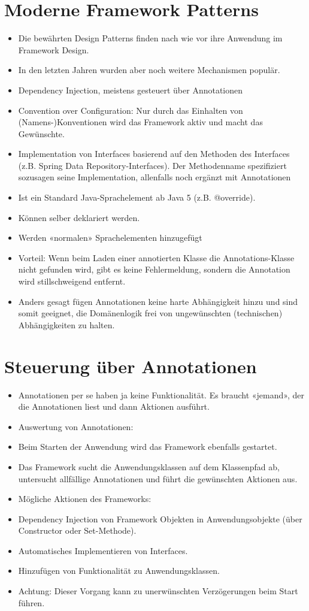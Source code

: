 \documentclass[10pt]{article}
\begin{document}
\section*{Moderne Framework Patterns}
\begin{itemize}
  \item Die bewährten Design Patterns finden nach wie vor ihre Anwendung im Framework Design.
  \item In den letzten Jahren wurden aber noch weitere Mechanismen populär.
  \item Dependency Injection, meistens gesteuert über Annotationen
  \item Convention over Configuration: Nur durch das Einhalten von (Namens-)Konventionen wird das Framework aktiv und macht das Gewünschte.
  \item Implementation von Interfaces basierend auf den Methoden des Interfaces (z.B. Spring Data Repository-Interfaces). Der Methodenname spezifiziert sozusagen seine Implementation, allenfalls noch ergänzt mit Annotationen
  \item Ist ein Standard Java-Sprachelement ab Java 5 (z.B. @override).
  \item Können selber deklariert werden.
  \item Werden «normalen» Sprachelementen hinzugefügt
  \item Vorteil: Wenn beim Laden einer annotierten Klasse die Annotations-Klasse nicht gefunden wird, gibt es keine Fehlermeldung, sondern die Annotation wird stillschweigend entfernt.
  \item Anders gesagt fügen Annotationen keine harte Abhängigkeit hinzu und sind somit geeignet, die Domänenlogik frei von ungewünschten (technischen) Abhängigkeiten zu halten.
\end{itemize}

\section*{Steuerung über Annotationen}
\begin{itemize}
  \item Annotationen per se haben ja keine Funktionalität. Es braucht «jemand», der die Annotationen liest und dann Aktionen ausführt.
  \item Auswertung von Annotationen:
  \item Beim Starten der Anwendung wird das Framework ebenfalls gestartet.
  \item Das Framework sucht die Anwendungsklassen auf dem Klassenpfad ab, untersucht allfällige Annotationen und führt die gewünschten Aktionen aus.
  \item Mögliche Aktionen des Frameworks:
  \item Dependency Injection von Framework Objekten in Anwendungsobjekte (über Constructor oder Set-Methode).
  \item Automatisches Implementieren von Interfaces.
  \item Hinzufügen von Funktionalität zu Anwendungsklassen.
  \item Achtung: Dieser Vorgang kann zu unerwünschten Verzögerungen beim Start führen.
\end{itemize}
\end{document}
